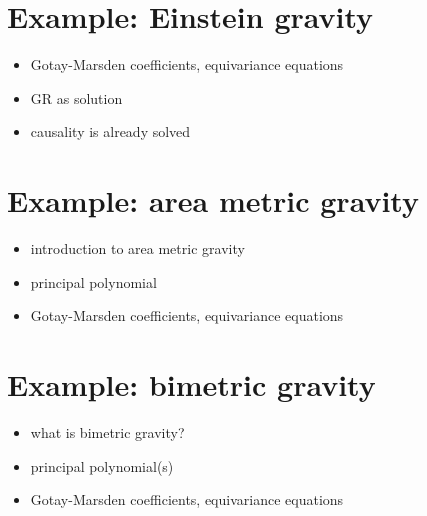 \section{Example: Einstein gravity}
\begin{itemize}
\item Gotay-Marsden coefficients, equivariance equations
\item GR as solution
\item causality is already solved
\end{itemize}

\section{Example: area metric gravity}
\begin{itemize}
\item introduction to area metric gravity
\item principal polynomial
\item Gotay-Marsden coefficients, equivariance equations
\end{itemize}

\section{Example: bimetric gravity}
\begin{itemize}
\item what is bimetric gravity?
\item principal polynomial(s)
\item Gotay-Marsden coefficients, equivariance equations
\end{itemize}

